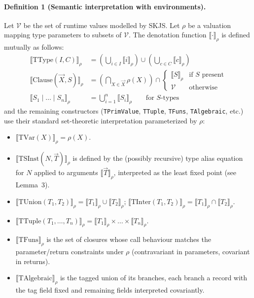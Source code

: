 \documentclass[11pt]{article}
\begin{document}
\paragraph{Definition 1 (Semantic interpretation with environments).}
Let $\mathcal{V}$ be the set of runtime values modelled by SKJS. Let $\rho$ be a valuation mapping type parameters to subsets of $\mathcal{V}$. The denotation function $\llbracket \cdot \rrbracket_\rho$ is defined mutually as follows:
\begin{align*}
\llbracket \text{TType}(I, C) \rrbracket_\rho
  &= \left(\bigcup_{i \in I} \llbracket i \rrbracket_\rho\right)
   \cup \left(\bigcup_{c \in C} \llbracket c \rrbracket_\rho\right) \\
\llbracket \text{Clause}(\vec{X}, S) \rrbracket_\rho
  &= \left(\bigcap_{X \in \vec{X}} \rho(X)\right)
     \cap
     \begin{cases}
       \llbracket S \rrbracket_\rho & \text{if } S \text{ present}\\
       \mathcal{V} & \text{otherwise}
     \end{cases} \\
\llbracket S_1 \mid \dots \mid S_n \rrbracket_\rho
  &= \bigcup_{i=1}^n \llbracket S_i \rrbracket_\rho \qquad\text{for $S$-types}
\end{align*}
and the remaining constructors (\texttt{TPrimValue}, \texttt{TTuple}, \texttt{TFuns}, \texttt{TAlgebraic}, etc.) use their standard set-theoretic interpretation parameterized by $\rho$:
\begin{itemize}[leftmargin=*]
  \item $\llbracket \text{TVar}(X) \rrbracket_\rho = \rho(X)$.
  \item $\llbracket \text{TSInst}(N,\vec{T}) \rrbracket_\rho$ is defined by the (possibly recursive) type alias equation for $N$ applied to arguments $\llbracket \vec{T} \rrbracket_\rho$, interpreted as the least fixed point (see Lemma~3).
  \item $\llbracket \text{TUnion}(T_1,T_2) \rrbracket_\rho = \llbracket T_1 \rrbracket_\rho \cup \llbracket T_2 \rrbracket_\rho$; $\llbracket \text{TInter}(T_1,T_2) \rrbracket_\rho = \llbracket T_1 \rrbracket_\rho \cap \llbracket T_2 \rrbracket_\rho$.
  \item $\llbracket \text{TTuple}(T_1,\dots,T_n) \rrbracket_\rho = \llbracket T_1 \rrbracket_\rho \times \dots \times \llbracket T_n \rrbracket_\rho$.
  \item $\llbracket \text{TFuns} \rrbracket_\rho$ is the set of closures whose call behaviour matches the parameter/return constraints under $\rho$ (contravariant in parameters, covariant in returns).
  \item $\llbracket \text{TAlgebraic} \rrbracket_\rho$ is the tagged union of its branches, each branch a record with the tag field fixed and remaining fields interpreted covariantly.
\end{itemize}
\end{document}
